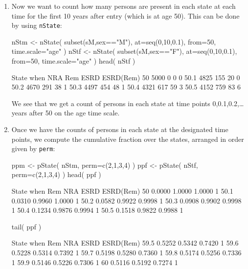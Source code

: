 \begin{enumerate}[resume]
\item Now we want to count how many persons are present in each state
  at each time for the first 10 years after entry (which is at age 50). This
  can be done by using \texttt{nState}:
\begin{Schunk}
\begin{Sinput}
 nStm <- nState( subset(sM,sex=="M"), at=seq(0,10,0.1), from=50, time.scale="age" )
 nStf <- nState( subset(sM,sex=="F"), at=seq(0,10,0.1), from=50, time.scale="age" )
 head( nStf )
\end{Sinput}
\begin{Soutput}
      State
when    NRA  Rem ESRD ESRD(Rem)
  50   5000    0    0         0
  50.1 4825  155   20         0
  50.2 4670  291   38         1
  50.3 4497  454   48         1
  50.4 4321  617   59         3
  50.5 4152  759   83         6
\end{Soutput}
\end{Schunk}
  We see that we get a count of persons in each state at time points
  0,0.1,0.2,\ldots years after 50 on the age time scale.

    
\item Once we have the counts of persons in each state at the
  designated time points, we compute the cumulative fraction over the
  states, arranged in order given by \texttt{perm}:
\begin{Schunk}
\begin{Sinput}
 ppm <- pState( nStm, perm=c(2,1,3,4) )
 ppf <- pState( nStf, perm=c(2,1,3,4) )
 head( ppf )
\end{Sinput}
\begin{Soutput}
      State
when      Rem    NRA   ESRD ESRD(Rem)
  50   0.0000 1.0000 1.0000         1
  50.1 0.0310 0.9960 1.0000         1
  50.2 0.0582 0.9922 0.9998         1
  50.3 0.0908 0.9902 0.9998         1
  50.4 0.1234 0.9876 0.9994         1
  50.5 0.1518 0.9822 0.9988         1
\end{Soutput}
\begin{Sinput}
 tail( ppf )
\end{Sinput}
\begin{Soutput}
      State
when      Rem    NRA   ESRD ESRD(Rem)
  59.5 0.5252 0.5342 0.7420         1
  59.6 0.5228 0.5314 0.7392         1
  59.7 0.5198 0.5280 0.7360         1
  59.8 0.5174 0.5256 0.7336         1
  59.9 0.5146 0.5226 0.7306         1
  60   0.5116 0.5192 0.7274         1
\end{Soutput}
\end{Schunk}



\end{enumerate}
